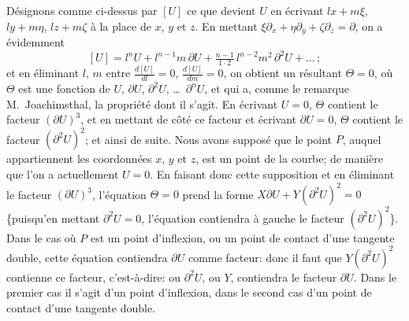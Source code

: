 \documentclass[11pt]{article}
\begin{document}
\medskip
D\'esignons comme ci-dessus par $[U]$ ce que devient $U$ en \'ecrivant $l x + m \xi$,
$l y + m \eta$, $l z + m \zeta$ \`a la place de $x$, $y$ et $z$. En mettant $\xi \partial_{x} + \eta \partial_{y} + \zeta \partial_{z} = \partial$, on a
\'evidemment
\[
[U] = l^{n} U + l^{n-1} m\, \partial U + \tfrac{n-1}{1 \cdot 2}\,l^{n-2} m^{2}\, \partial^{2} U + \ldots\,;
\]
et en \'eliminant $l$, $m$ entre $\tfrac{d[U]}{dl} = 0$, $\tfrac{d[U]}{dm} = 0$, on obtient un r\'esultant $\Theta = 0$, o\`u $\Theta$ est
une fonction de $U$, $\partial U$, $\partial^{2} U$, \ldots\ $\partial^{n} U$, et qui a, comme le remarque M.~Joachimsthal,
la propri\'et\'e dont il s'agit. En \'ecrivant $U = 0$, $\Theta$ contient le facteur $(\partial U)^{3}$, et en
mettant de c\^ot\'e ce facteur et \'ecrivant $\partial U = 0$, $\Theta$ contient le facteur $(\partial^{2} U)^{2}$; et ainsi
de suite. Nous avons suppos\'e que le point $P$, auquel appartiennent les coordonn\'ees
$x$, $y$ et $z$, est un point de la courbe; de mani\`ere que l'on a actuellement $U = 0$. En
faisant donc cette supposition et en \'eliminant le facteur $(\partial U)^{3}$, l'\'equation $\Theta = 0$ prend
la forme $X \partial U + Y(\partial^{2} U)^{2} = 0$ \{puisqu'en mettant $\partial^{2} U = 0$, l'\'equation contiendra \`a gauche
le facteur $(\partial^{2} U)^{2}$\}. Dans le cas o\`u $P$ est un point d'inflexion, ou un point de contact
d'une tangente double, cette \'equation contiendra $\partial U$ comme facteur: donc il faut que
$Y(\partial^{2} U)^{2}$ contienne ce facteur, c'est-\`a-dire: ou $\partial^{2} U$, ou $Y$, contiendra le facteur $\partial U$.
Dans le premier cas il s'agit d'un point d'inflexion, dans le second cas d'un point de
contact d'une tangente double.
\end{document}
